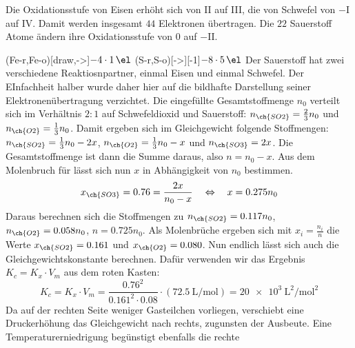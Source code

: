 \documentclass[DIV11]{scrartcl}
\begin{document}
\begin{solution}
  \begin{tasks}
    \task Die Oxidationsstufe von Eisen erhöht sich von II auf III, die von
      Schwefel von $-$I auf IV.  Damit werden insgesamt $44$ Elektronen
      übertragen.  Die $22$ Sauerstoff Atome ändern ihre Oxidationsstufe von
      $0$ auf $-$II.
      \vspace*{2\bigskipamount}
      \begin{center}
      \end{center}
      \vspace*{2\bigskipamount}
      \redox(Fe-r,Fe-o)[draw,->]{$-4\cdot1\,\el$}%
      \redox(S-r,S-o)[->][-1]{$-8\cdot5\,\el$}%
      Der Sauerstoff hat zwei verschiedene Reaktiosnpartner, einmal Eisen und
      einmal Schwefel.  Der EInfachheit halber wurde daher hier auf die
      bildhafte Darstellung seiner Elektronenübertragung verzichtet.
    \task Die eingefüllte Gesamtstoffmenge $n_0$ verteilt sich im Verhältnis
      $2:1$ auf Schwefeldioxid und Sauerstoff: $n_{\ch{SO2}} = \frac{2}{3}n_0$
      und $n_{\ch{O2}} = \frac{1}{3}n_0$.  Damit ergeben sich im Gleichgewicht
      folgende Stoffmengen: $n_{\ch{SO2}} = \frac{1}{3}n_0 - 2x$, $n_{\ch{O2}}
      = \frac{1}{3}n_0 - x$ und $n_{\ch{SO3}} = 2x$. Die Gesamtstoffmenge ist
      dann die Summe daraus, also $n=n_0-x$.  Aus dem Molenbruch für 
      lässt sich nun $x$ in Abhängigkeit von $n_0$ bestimmen.
      \[
        x_{\ch{SO3}} = 0.76 = \frac{2x}{n_0-x}
        \quad \Leftrightarrow \quad
        x = 0.275n_0
      \]
      Daraus berechnen sich die Stoffmengen zu $n_{\ch{SO2}} = 0.117n_0$,
      $n_{\ch{O2}} = 0.058n_0$, $n = 0.725n_0$.  Als Molenbrüche ergeben sich
      mit $x_i=\frac{n_i}{n}$ die Werte $x_{\ch{SO2}} = 0.161$ und
      $x_{\ch{O2}} = 0.080$.  Nun endlich lässt sich auch die
      Gleichgewichtskonstante berechnen.  Dafür verwenden wir das Ergebnis
      $K_c=K_x\cdot V_m$ aus dem roten Kasten:
      \[
        K_c = K_x\cdot V_m
            = \frac{0.76^2}{0.161^2\cdot0.08}\cdot
              (\SI{72.5}{\liter\per\mole})
            = \SI[scientific-notation=true]{20e3}{\liter\squared\per\mole\squared}
      \]
    \task Da auf der rechten Seite weniger Gasteilchen vorliegen, verschiebt
      eine Druckerhöhung das Gleichgewicht nach rechts, zugunsten der
      Ausbeute.  Eine Temperaturerniedrigung begünstigt ebenfalls die rechte

\end{tasks}
\end{solution}
\end{document}
